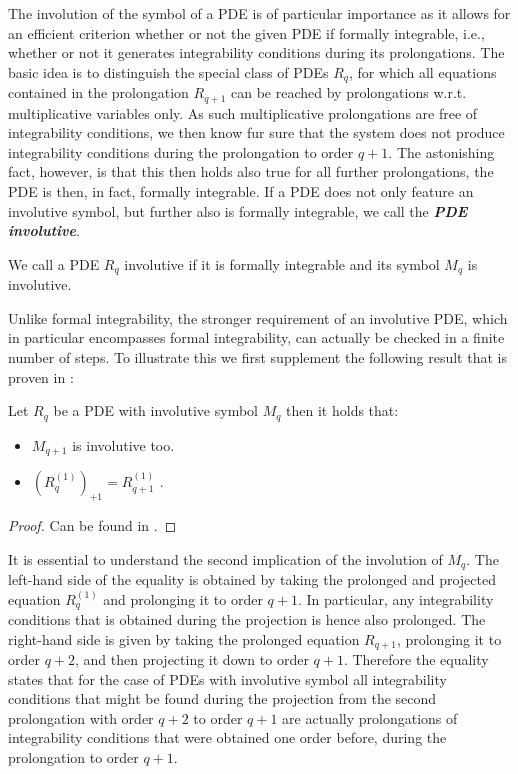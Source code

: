 The involution of the symbol of a PDE is of particular importance as it allows for an efficient criterion whether or not the given PDE if formally integrable, i.e., whether or not it generates integrability conditions during its prolongations.
The basic idea is to distinguish the special class of PDEs $R_q$, for which all equations contained in the prolongation $R_{q+1}$ can be reached by prolongations w.r.t. multiplicative variables only. As such multiplicative prolongations are free of integrability conditions, we then know fur sure that the system does not produce integrability conditions during the prolongation to order $q+1$. The astonishing fact, however, is that this then holds also true for all further prolongations, the PDE is then, in fact, formally integrable. 
If a PDE does not only feature an involutive symbol, but further also is formally integrable, we call the \textit{\textbf{PDE involutive}}.
\begin{definition} \label{invol}
We call a PDE $R_q$ involutive if it is formally integrable and its symbol $M_q$ is involutive.
\end{definition}
Unlike formal integrability, the stronger requirement of an involutive PDE, which in particular encompasses formal integrability, can actually be checked in a finite number of steps.
To illustrate this we first supplement the following result that is proven in \cite{seiler1994analysis}:
\begin{theorem}\label{invoCons}
Let $R_q$ be a PDE with involutive symbol $M_q$ then it holds that:
\begin{itemize}
    \item $M_{q+1}$ is involutive too.
    \item $(R_{q}^{(1)})_{+1} = R_{q+1}^{(1)}$ .
\end{itemize}
\end{theorem}
\begin{proof}
Can be found in \cite{seiler1994analysis}.
\end{proof}
It is essential to understand the second implication of the involution of $M_q$. The left-hand side of the equality is obtained by taking the prolonged and projected equation $R_q^{(1)}$ and prolonging it to order $q+1$. In particular, any integrability conditions that is obtained during the projection is hence also prolonged. The right-hand side is given by taking the prolonged equation $R_{q+1}$, prolonging it to order $q+2$, and then projecting it down to order $q+1$. Therefore the equality states that for the case of PDEs with involutive symbol all integrability conditions that might be found during the projection from the second prolongation with order $q+2$ to order $q+1$ are actually prolongations of integrability conditions that were obtained one order before, during the prolongation to order $q+1$.
